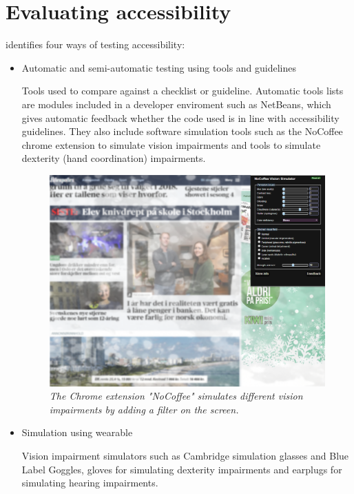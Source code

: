 \section{Evaluating accessibility}
\textcite{bai_evaluation_2016} identifies four ways of testing accessibility:
\begin{itemize}
    \item Automatic and semi-automatic testing using tools and guidelines
    
    Tools used to compare against a checklist or guideline. Automatic tools \textcite{bai_evaluation_2016} lists are modules included in a developer enviroment such as NetBeans, which gives automatic feedback whether the code used is in line with accessibility guidelines. They also include software simulation tools such as the NoCoffee chrome extension to simulate vision impairments and tools to simulate dexterity (hand coordination) impairments.
    
    \begin{figure}[H]
          \includegraphics[width=\linewidth]{img/nocoffee.PNG}
          \caption{\textit{The Chrome extension "NoCoffee" simulates different vision impairments by adding a filter on the screen.}}\label{fig:nocoffee_browser_extension_theory_1}
        \endminipage\hfill
    \end{figure}
    \item Simulation using wearable
    
    Vision impairment simulators such as Cambridge simulation glasses and Blue Label Goggles, gloves for simulating dexterity impairments and earplugs for simulating hearing impairments.


\end{itemize}
